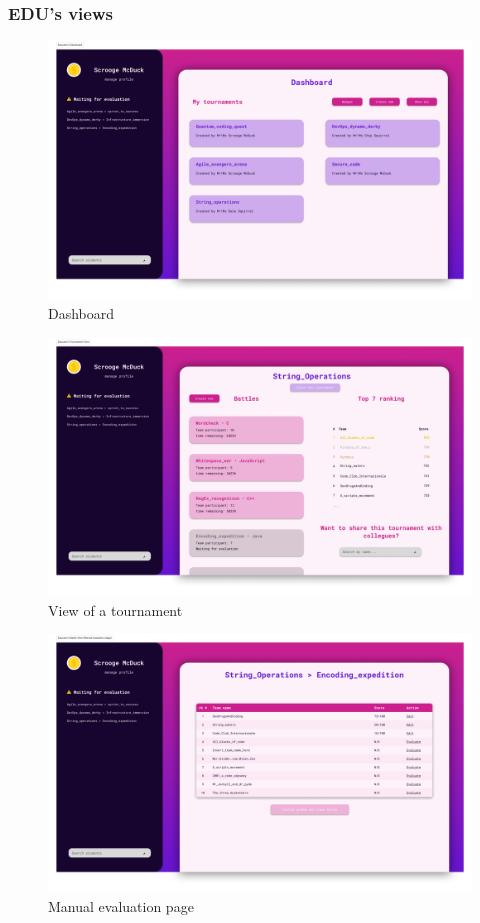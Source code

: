 \subsubsection*{EDU's views}
\begin{figure}[H]
    \centering
    \includegraphics[width=1\textwidth]{images/user_interfaces/educator_dashboard.png}
    \caption{Dashboard}
\end{figure}
\begin{figure}[H]
    \centering
    \includegraphics[width=1\textwidth]{images/user_interfaces/educator_tournament_view.png}
    \caption{View of a tournament}
\end{figure}
\begin{figure}[H]
    \centering
    \includegraphics[width=1\textwidth]{images/user_interfaces/manual_evaluation.png}
    \caption{Manual evaluation page}
\end{figure}
